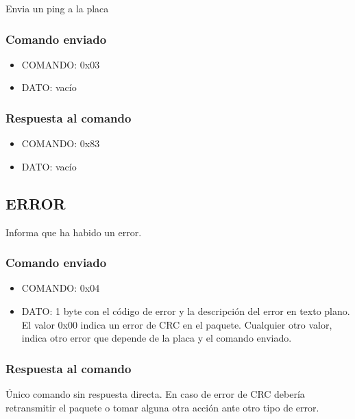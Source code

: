 \documentclass[a4paper,10pt]{article}
\begin{document}
Envia un ping a la placa

\subsubsection*{Comando enviado}
\label{ping_comando_enviado}

\begin{itemize}
	\item{COMANDO:} 0x03
	\item{DATO:} vac\'io
\end{itemize}

\subsubsection*{Respuesta al comando}
\label{ping_respuesta}

\begin{itemize}
	\item{COMANDO:} 0x83
	\item{DATO:} vac\'io
\end{itemize}

\subsection{ERROR}
\label{error}

Informa que ha habido un error.

\subsubsection*{Comando enviado}
\label{error_comando_enviado}

\begin{itemize}
	\item{COMANDO:} 0x04
	\item{DATO:} 1 byte con el c\'odigo de error y la descripci\'on del error en texto plano.
	El valor 0x00 indica un error de CRC en el paquete.
	Cualquier otro valor, indica otro error que depende de la placa y el comando enviado.
\end{itemize}

\subsubsection*{Respuesta al comando}
\label{error_respuesta}

\'Unico comando sin respuesta directa.
En caso de error de CRC deber\'ia retransmitir el paquete o tomar alguna otra acci\'on ante otro tipo de error.
\end{document}

